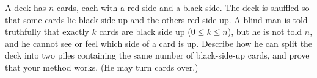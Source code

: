 A deck has $n$ cards, each with a red side and a black side. The deck is shuffled so that some cards lie black side up and the others red side up. A blind man is told truthfully that exactly $k$ cards are black side up ($0\le k\le n$), but he is not told $n$, and he cannot see or feel which side of a card is up. Describe how he can split the deck into two piles containing the same number of black-side-up cards, and prove that your method works. (He may turn cards over.)
